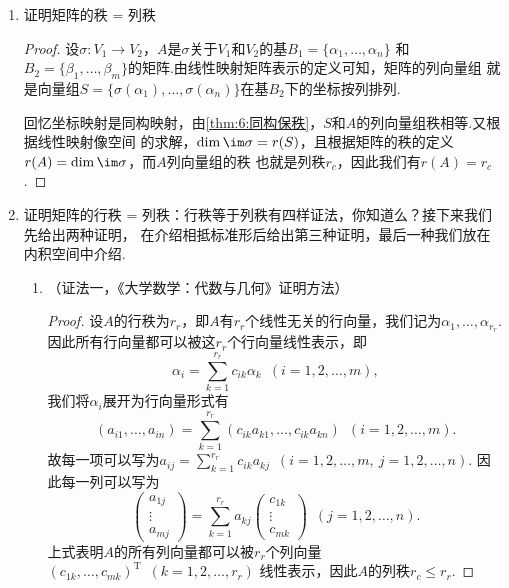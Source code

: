\begin{enumerate}
    \item 证明矩阵的秩 = 列秩
    
    \begin{proof}
        设$\sigma:V_1\to V_2$，$A$是$\sigma$关于$V_1$和$V_2$的基$B_1=\{\alpha_1,\ldots,\alpha_n\}$
        和$B_2=\{\beta_1,\ldots,\beta_m\}$的矩阵.由线性映射矩阵表示的定义可知，矩阵的列向量组
        就是向量组$S=\{\sigma(\alpha_1),\ldots,\sigma(\alpha_n)\}$在基$B_2$下的坐标按列排列.

        回忆坐标映射是同构映射，由\autoref{thm:6:同构保秩}，$S$和$A$的列向量组秩相等.又根据线性映射像空间
        的求解，$\dim\im\sigma=r(S)$，且根据矩阵的秩的定义$r(A)=\dim\im\sigma$，而$A$列向量组的秩
        也就是列秩$r_c$，因此我们有$r(A)=r_c$.
    \end{proof}

    \item 证明矩阵的行秩 = 列秩：行秩等于列秩有四样证法，你知道么？接下来我们先给出两种证明，
    在介绍相抵标准形后给出第三种证明，最后一种我们放在内积空间中介绍.
    \begin{enumerate}[label=(\arabic*)]
        \item （证法一，《大学数学：代数与几何》证明方法）
        
        \begin{proof}
            设$A$的行秩为$r_r$，即$A$有$r_r$个线性无关的行向量，我们记为$\alpha_1,\ldots,\alpha_{r_r}$.
            因此所有行向量都可以被这$r_r$个行向量线性表示，即
            \[\alpha_i=\sum\limits_{k=1}^{r_r}c_{ik}\alpha_k\enspace(i=1,2,\ldots,m),\]
            我们将$\alpha_i$展开为行向量形式有
            \[(a_{i1},\ldots,a_{in})=\sum\limits_{k=1}^{r_r}(c_{ik}a_{k1},\ldots,c_{ik}a_{kn})\enspace(i=1,2,\ldots,m).\]
            故每一项可以写为$a_{ij}=\sum\limits_{k=1}^{r_r}c_{ik}a_{kj}\enspace(i=1,2,\ldots,m,\ j=1,2,\ldots,n)$.
            因此每一列可以写为
            \[\begin{pmatrix}
                a_{1j} \\ \vdots \\ a_{mj}
            \end{pmatrix}=\sum\limits_{k=1}^{r_r}a_{kj}\begin{pmatrix}
                c_{1k} \\ \vdots \\ c_{mk}
            \end{pmatrix}\enspace(j=1,2,\ldots,n).\]
            上式表明$A$的所有列向量都可以被$r_r$个列向量$(c_{1k},\ldots,c_{mk})^\mathrm{T}\enspace(k=1,2,\ldots,r_r)$
            线性表示，因此$A$的列秩$r_c\leqslant r_r$.


\end{proof}
\end{enumerate}
\end{enumerate}
